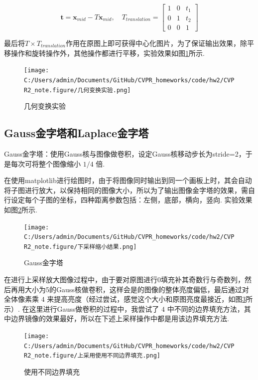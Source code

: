 \documentclass[12pt, a4paper, oneside]{ctexart}
\numberwithin{equation}{section}  %
\begin{document}
\[\boldsymbol{t} = \boldsymbol{x}_{mid} - T\boldsymbol{x}_{mid},\quad T_{translation}=\left[\begin{matrix}1&0&t_1\\ 0&1&t_2\\0&0&1\end{matrix}\right]\]

最后将$T\times T_{translation}$作用在原图上即可获得中心化图片，为了保证输出效果，除平移操作和旋转操作外，其他操作都进行平移，实验效果如图\ref{fig-1}所示.

\begin{figure}[htbp]
    \centering
    \hspace*{-1.5cm}
    \texttt{[image: C:/Users/admin/Documents/GitHub/CVPR\_homeworks/code/hw2/CVPR2\_note.figure/几何变换实验.png]}
    \caption{几何变换实验\label{fig-1}}
\end{figure}

\subsection{Gauss金字塔和Laplace金字塔}

Gauss金字塔：使用Gauss核与图像做卷积，设定Gauss核移动步长为stride=2，于是每次可将整个图像缩小
\(1/4\) 倍.

在使用matplotlib进行绘图时，由于将图像同时输出到同一个画板上时，其会自动将子图进行放大，以保持相同的图像大小，所以为了输出图像金字塔的效果，需自行设定每个子图的坐标，四种距离参数包括：左侧，底部，横向，竖向. 实验效果如图\ref{fig-2}所示.

\begin{figure}[htbp]
    \centering
    \texttt{[image: C:/Users/admin/Documents/GitHub/CVPR\_homeworks/code/hw2/CVPR2\_note.figure/下采样缩小结果.png]}
    \caption{Gauss金字塔\label{fig-2}}
\end{figure}

在进行上采样放大图像过程中，由于要对原图进行0填充补其奇数行与奇数列，然后再用大小为5的Gauss核做卷积，这样会是的图像的整体亮度偏低，最后通过对全体像素乘
\(4\) 来提高亮度（经过尝试，感觉这个大小和原图亮度最接近，如图\ref{fig-3}所示）.
在这里进行Gauss做卷积的过程中，我尝试了 \(4\)
中不同的边界填充方法，其中边界镜像的效果最好，所以在下述上采样操作中都是用该边界填充方法.

\begin{figure}[htbp]
    \centering
    \hspace*{-1cm}
    \texttt{[image: C:/Users/admin/Documents/GitHub/CVPR\_homeworks/code/hw2/CVPR2\_note.figure/上采用使用不同边界填充.png]}
    \caption{使用不同边界填充\label{fig-3}}
\end{figure}
\end{document}

